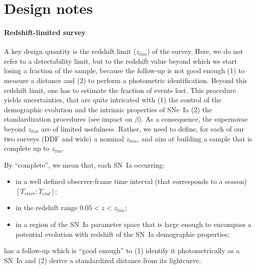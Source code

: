 \documentclass[\docopts]{\docclass}
\begin{document}



\section{Design notes}
\label{sec:design_notes}

\paragraph{Redshift-limited survey} A key design quantity is the
redshift limit ($z_{lim}$) of the survey. Here, we do not refer to a
detectability limit, but to the redshift value beyond which we start
losing a fraction of the sample, because the follow-up is not good
enough (1) to measure a distance and (2) to perform a photometric
identification.  Beyond this redshift limit, one has to estimate the
fraction of events lost. This procedure yields uncertainties, that are
quite intricated with (1) the control of the demographic evolution and
the intrinsic properties of SNe~Ia (2) the standardization procedures
(see impact on $\beta$).  As a consequence, the supernovae beyond
$z_{lim}$ are of limited usefulness.  Rather, we need to define, for
each of our two surveys (DDF and wide) a nominal $z_{lim}$, and aim at
building a sample that is complete up to $z_{lim}$.

By ``complete'', we mean that, each SN~Ia occurring:
\begin{itemize}
\item in a well defined observer-frame time interval (that corresponds
  to a season) $[T_{start}; T_{end}]$;
\item in the redshift range $0.05 < z < z_{lim}$;
\item in a region of the SN~Ia parameter space that is large enough to
  encompass a potential evolution with redshift of the SN~Ia
  demographic properties;
\end{itemize}
has a follow-up which is ``good enough'' to (1) identify it
photometrically as a SN~Ia and (2) derive a standardized distance from
its lightcurve.
\end{document}
